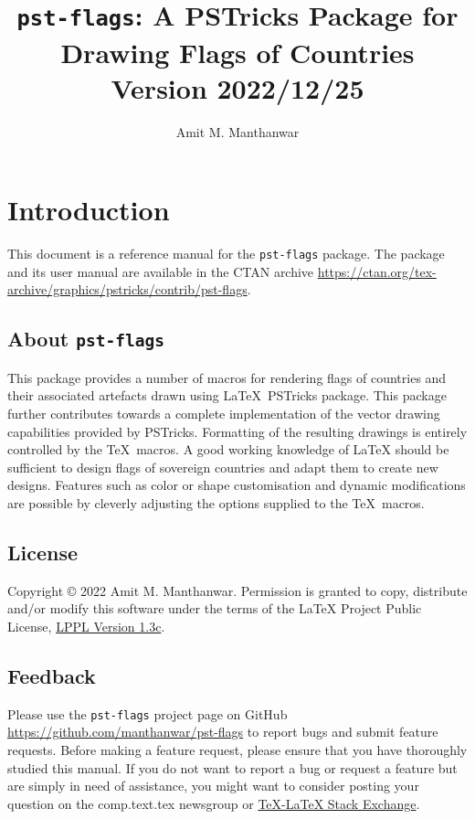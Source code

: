 \documentclass{amm-pst-doc}
\title{\vspace*{-10mm}
\texttt{pst-flags}: A PSTricks Package for Drawing Flags of Countries\\[2mm]
\Large{Version 2022/12/25}}
\author{Amit M. Manthanwar}
\date{}
\begin{document}
\maketitle

\section{Introduction}
This document is a reference manual for the \texttt{pst-flags} package. The package and its user manual are available in the CTAN archive \href{https://ctan.org/tex-archive/graphics/pstricks/contrib/pst-flags} {https://ctan.org/tex-archive/graphics/pstricks/contrib/pst-flags}.

\subsection{About \texttt{pst-flags}}
This package provides a number of macros for rendering flags of countries and their associated artefacts drawn using \LaTeX\ PSTricks package. This package further contributes towards a complete implementation of the vector drawing capabilities provided by PSTricks. Formatting of the resulting drawings is entirely controlled by the \TeX\ macros. A good working knowledge of LaTeX should be sufficient to design flags of sovereign countries and adapt them to create new designs. Features such as color or shape customisation and dynamic modifications are possible by cleverly adjusting the options supplied to the \TeX\ macros.

\subsection{License}
Copyright © 2022 Amit M. Manthanwar. Permission is granted to
copy, distribute and/or modify this software under the terms of the LaTeX Project Public License, \href{https://www.latex-project.org/lppl.txt}{LPPL Version 1.3c}.

\subsection{Feedback}
Please use the \texttt{pst-flags} project page on GitHub \href{https://github.com/manthanwar/pst-flags}{https://github.com/manthanwar/pst-flags} to report bugs and submit feature requests. Before making a feature request, please ensure that you have thoroughly studied this manual. If you do not want to report a bug or request a feature but are simply in need of assistance, you might want to consider posting your question on the comp.text.tex newsgroup or  \href{https://tex.stackexchange.com/questions/tagged/pst-flags} {TeX-LaTeX Stack Exchange}.
\end{document}

